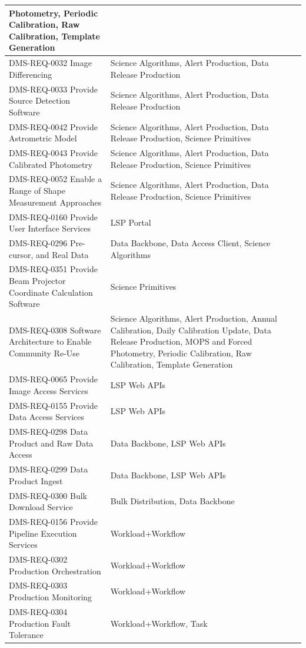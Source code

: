 \documentclass[DM,lsstdraft,toc]{lsstdoc}
\begin{document}
\begin{xtabular}{|p{0.4\textwidth}|p{0.55\textwidth}|}
Photometry, Periodic Calibration, Raw Calibration, Template
Generation\\ \hline
DMS-REQ-0032 Image Differencing & Science Algorithms, Alert Production,
Data Release Production\\ \hline
DMS-REQ-0033 Provide Source Detection Software & Science Algorithms,
Alert Production, Data Release Production\\ \hline
DMS-REQ-0042 Provide Astrometric Model & Science Algorithms, Alert
Production, Data Release Production, Science Primitives\\ \hline
DMS-REQ-0043 Provide Calibrated Photometry & Science Algorithms, Alert
Production, Data Release Production, Science Primitives\\ \hline
DMS-REQ-0052 Enable a Range of Shape Measurement Approaches & Science
Algorithms, Alert Production, Data Release Production, Science Primitives\\ \hline
DMS-REQ-0160 Provide User Interface Services & LSP Portal\\ \hline
DMS-REQ-0296 Pre-cursor, and Real Data & Data Backbone, Data Access
Client, Science Algorithms\\ \hline
DMS-REQ-0351 Provide Beam Projector Coordinate Calculation Software
& Science Primitives\\ \hline
DMS-REQ-0308 Software Architecture to Enable Community Re-Use & Science
Algorithms, Alert Production, Annual Calibration, Daily Calibration
Update, Data Release Production, MOPS and Forced Photometry, Periodic
Calibration, Raw Calibration, Template Generation\\ \hline
DMS-REQ-0065 Provide Image Access Services & LSP Web APIs\\ \hline
DMS-REQ-0155 Provide Data Access Services & LSP Web APIs\\ \hline
DMS-REQ-0298 Data Product and Raw Data Access & Data Backbone, LSP Web APIs\\ \hline
DMS-REQ-0299 Data Product Ingest & Data Backbone, LSP Web APIs\\ \hline
DMS-REQ-0300 Bulk Download Service & Bulk Distribution, Data
Backbone\\ \hline
DMS-REQ-0156 Provide Pipeline Execution Services &
Workload+Workflow\\ \hline
DMS-REQ-0302 Production Orchestration & Workload+Workflow\\ \hline
DMS-REQ-0303 Production Monitoring & Workload+Workflow\\ \hline
DMS-REQ-0304 Production Fault Tolerance & Workload+Workflow, Task

\end{xtabular}
\end{document}
